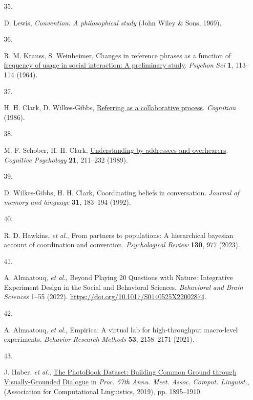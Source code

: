 \documentclass[9pt,twocolumn,twoside]{pnas-new}
\makeatletter
\newlength{\cslhangindent}
\newlength{\csllabelwidth}
\newenvironment{CSLReferences}[2] %
 {\begin{list}{}{%
  \setlength{\itemindent}{0pt}
  \setlength{\leftmargin}{0pt}
  \setlength{\parsep}{0pt}
   \normalfont\sffamily\fontsize{6}{8}\selectfont
    \labelsep2.8pt
   \renewcommand\newblock{\hskip .11em \@plus.33em \@minus.07em}
  \ifodd #1
   \setlength{\leftmargin}{\cslhangindent}
   \setlength{\itemindent}{-1\cslhangindent}
  \fi
  \setlength{\itemsep}{0.0pt}}}
 {\end{list}}
\newcommand{\CSLLeftMargin}[1]{\parbox[t]{\csllabelwidth}{#1}}
\newcommand{\CSLRightInline}[1]{\parbox[t]{\linewidth - \csllabelwidth}{#1}\break}
\makeatother
\begin{document}
\begin{CSLReferences}{0}{1}
	\CSLLeftMargin{35. }%
	\CSLRightInline{D. Lewis, \emph{Convention: A philosophical study} (John
		Wiley \& Sons, 1969).}
	
	\CSLLeftMargin{36. }%
	\CSLRightInline{R. M. Krauss, S. Weinheimer,
		\href{https://doi.org/10.3758/BF03342817}{Changes in reference phrases
			as a function of frequency of usage in social interaction: A preliminary
			study}. \emph{Psychon Sci} \textbf{1}, 113--114 (1964).}
	
	\CSLLeftMargin{37. }%
	\CSLRightInline{H. H. Clark, D. Wilkes-Gibbs,
		\href{http://www.speech.kth.se/~edlund/bielefeld/references/clark-and-wilkes-gibbs-1986.pdf}{Referring
			as a collaborative process}. \emph{Cognition} (1986).}
	
	\CSLLeftMargin{38. }%
	\CSLRightInline{M. F. Schober, H. H. Clark,
		\href{https://doi.org/10.1016/0010-0285(89)90008-X}{Understanding by
			addressees and overhearers}. \emph{Cognitive Psychology} \textbf{21},
		211--232 (1989).}
	
	\CSLLeftMargin{39. }%
	\CSLRightInline{D. Wilkes-Gibbs, H. H. Clark, Coordinating beliefs in
		conversation. \emph{Journal of memory and language} \textbf{31},
		183--194 (1992).}
	
	\CSLLeftMargin{40. }%
	\CSLRightInline{R. D. Hawkins, \emph{et al.}, From partners to
		populations: A hierarchical bayesian account of coordination and
		convention. \emph{Psychological Review} \textbf{130}, 977 (2023).}
	
	\CSLLeftMargin{41. }%
	\CSLRightInline{A. Almaatouq, \emph{et al.}, Beyond {Playing} 20
		{Questions} with {Nature}: {Integrative Experiment Design} in the
		{Social} and {Behavioral Sciences}. \emph{Behavioral and Brain Sciences}
		1--55 (2022). \url{https://doi.org/10.1017/S0140525X22002874}.}
	
	\CSLLeftMargin{42. }%
	\CSLRightInline{A. Almaatouq, \emph{et al.}, Empirica: A virtual lab for
		high-throughput macro-level experiments. \emph{Behavior Research
			Methods} \textbf{53}, 2158--2171 (2021).}
	
	\CSLLeftMargin{43. }%
	\CSLRightInline{J. Haber, \emph{et al.},
		\href{https://doi.org/10.18653/v1/P19-1184}{The {PhotoBook Dataset}:
			{Building Common Ground} through {Visually-Grounded Dialogue}} in
		\emph{Proc. 57th {Annu}. {Meet}. {Assoc}. {Comput}. {Linguist}.},
		({Association for Computational Linguistics}, 2019), pp. 1895--1910.}
	

\end{CSLReferences}
\end{document}
